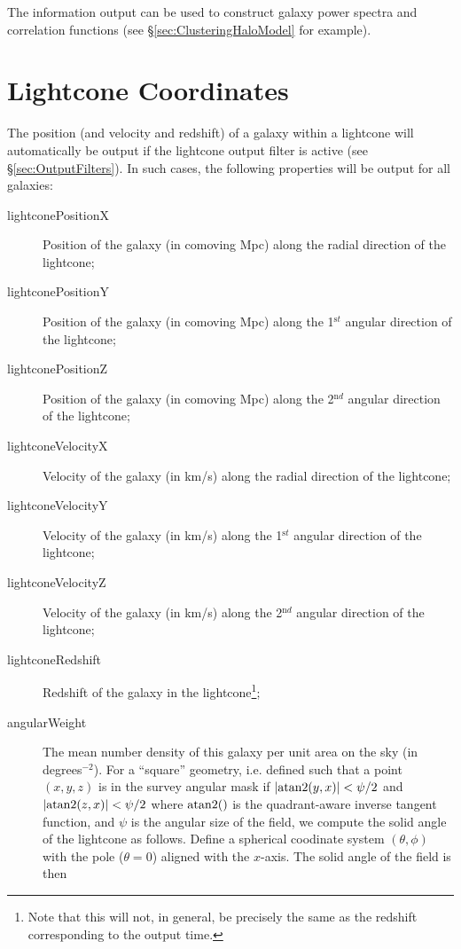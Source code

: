 The information output can be used to construct galaxy power spectra and correlation functions (see \S\ref{sec:ClusteringHaloModel} for example).

\section{Lightcone Coordinates}\label{sec:OutputLightcone}

The position (and velocity and redshift) of a galaxy within a lightcone will automatically be output if the {\normalfont \ttfamily lightcone} output filter is active (see \S\ref{sec:OutputFilters}). In such cases, the following properties will be output for all galaxies:
\begin{description}
 \item [{\normalfont \ttfamily lightconePositionX}] Position of the galaxy (in comoving Mpc) along the radial direction of the lightcone;
 \item [{\normalfont \ttfamily lightconePositionY}] Position of the galaxy (in comoving Mpc) along the 1$^{\mathrm st}$ angular direction of the lightcone;
 \item [{\normalfont \ttfamily lightconePositionZ}] Position of the galaxy (in comoving Mpc) along the 2$^{\mathrm nd}$ angular direction of the lightcone;
 \item [{\normalfont \ttfamily lightconeVelocityX}] Velocity of the galaxy (in km/s) along the radial direction of the lightcone;
 \item [{\normalfont \ttfamily lightconeVelocityY}] Velocity of the galaxy (in km/s) along the 1$^{\mathrm st}$ angular direction of the lightcone;
 \item [{\normalfont \ttfamily lightconeVelocityZ}] Velocity of the galaxy (in km/s) along the 2$^{\mathrm nd}$ angular direction of the lightcone;
 \item [{\normalfont \ttfamily lightconeRedshift}] Redshift of the galaxy in the lightcone\footnote{Note that this will not, in general, be precisely the same as the redshift corresponding to the output time.};
 \item [{\normalfont \ttfamily angularWeight}] The mean number density of this galaxy per unit area on the sky (in degrees$^{-2}$). For a ``square'' geometry, i.e. defined such that a point $(x,y,z)$ is in the survey angular mask if $|\hbox{atan2}(y,x)| < \psi/2$ and $|\hbox{atan2}(z,x)| < \psi/2$ where $\hbox{atan2}()$ is the quadrant-aware inverse tangent function, and $\psi$ is the angular size of the field, we compute the solid angle of the lightcone as follows. Define a spherical coodinate system $(\theta,\phi)$ with the pole ($\theta=0$) aligned with the $x$-axis. The solid angle of the field is then

\end{description}
